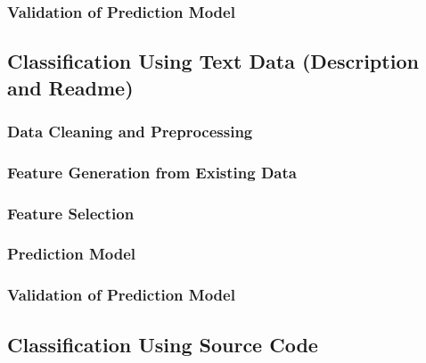 \documentclass[%
a4paper,
DIV12,
2.5headlines,
bigheadings,
titlepage,
openbib,
]{scrartcl}
\begin{document}
\subsubsection{Validation of Prediction
Model}\label{validation-of-prediction-model}



\subsection{Classification Using Text Data (Description and
Readme)}\label{classification-using-text-data-description-and-readme}




\subsubsection{Data Cleaning and
Preprocessing}\label{data-cleaning-and-preprocessing-1}




\subsubsection{Feature Generation from Existing
Data}\label{feature-generation-from-existing-data}




\subsubsection{Feature Selection}\label{feature-selection-1}



\subsubsection{Prediction Model}\label{prediction-model-1}



\subsubsection{Validation of Prediction Model}\label{validation-of-prediction-model-1}



\subsection{Classification Using Source
Code}\label{classification-using-source-code}
\end{document}
